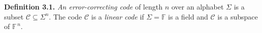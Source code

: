 

\textbf{Definition 3.1.}
\emph{An error-correcting code} of length $n$ over an alphabet $\Sigma$ is a subset $\mathcal{C}\subseteq\Sigma^{n}$.
The code $\mathcal{C}$ is a \emph{linear code} if $\Sigma=\mathbb{F}$ is a field and $\mathcal{C}$ is a subspace of $\mathbb{F}^{\,n}$.
